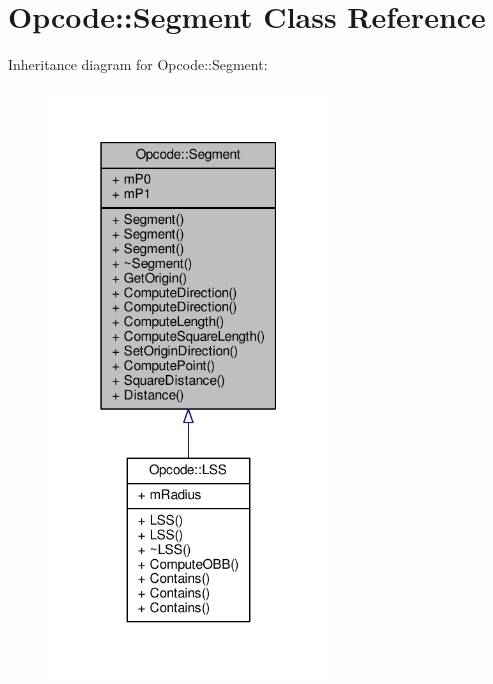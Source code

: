 \hypertarget{classOpcode_1_1Segment}{}\section{Opcode\+:\+:Segment Class Reference}
\label{classOpcode_1_1Segment}


Inheritance diagram for Opcode\+:\+:Segment\+:
\nopagebreak
\begin{figure}[H]
\begin{center}
\leavevmode
\includegraphics[width=211pt]{d8/d49/classOpcode_1_1Segment__inherit__graph}
\end{center}
\end{figure}


